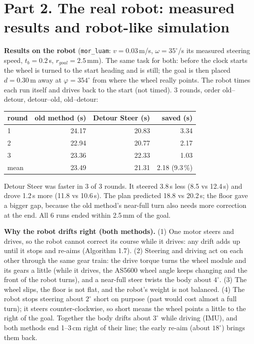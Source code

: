 \documentclass[11pt,a4paper]{article}
\begin{document}
\section*{Part 2. The real robot: measured results and robot-like simulation}
{\small
\noindent\textbf{Results on the robot} (\texttt{mor\_luam}: $v = 0.03$\,m/s, $\omega = 35^\circ$/s its measured
steering speed, $t_b = 0.2$\,s, $r_{goal} = 2.5$\,mm). The same task for both: before the clock starts the
wheel is turned to the start heading and is still; the goal is then placed $d = 0.30$\,m away at
$\varphi = 354^\circ$ from where the wheel really points. The robot times each run itself and drives back to
the start (not timed). 3 rounds, order old--detour, detour--old, old--detour:
\begin{center}
\begin{tabular}{lrrr}
\toprule
round & old method (s) & Detour Steer (s) & saved (s) \\
\midrule
1 & 24.17 & 20.83 & 3.34 \\
2 & 22.94 & 20.77 & 2.17 \\
3 & 23.36 & 22.33 & 1.03 \\
\midrule
mean & 23.49 & 21.31 & 2.18 (9.3\,\%) \\
\bottomrule
\end{tabular}
\end{center}
\noindent Detour Steer was faster in 3 of 3 rounds. It steered 3.8\,s less (8.5 vs 12.4\,s) and drove 1.2\,s
more (11.8 vs 10.6\,s). The plan predicted 18.8 vs 20.2\,s; the floor gave a bigger gap, because the old
method's near-full turn also needs more correction at the end. All 6 runs ended within 2.5\,mm of the goal.

\medskip
\noindent\textbf{Why the robot drifts right (both methods).}
(1) One motor steers and drives, so the robot cannot correct its course while it drives: any drift adds up
until it stops and re-aims (Algorithm 1.7).
(2) Steering and driving act on each other through the same gear train: the drive torque turns the wheel
module and its gears a little (while it drives, the AS5600 wheel angle keeps changing and the
front of the robot turns), and a near-full steer twists the body about $4^\circ$.
(3) The wheel slips, the floor is not flat, and the robot's weight is not balanced.
(4) The robot stops steering about $2^\circ$ short on purpose (past would cost almost a full turn); it steers
counter-clockwise, so short means the wheel points a little to the right of the goal.
Together the body drifts about $3^\circ$ while driving (IMU), and both methods end 1--3\,cm right of their
line; the early re-aim (about $18^\circ$) brings them back.

}
\end{document}
